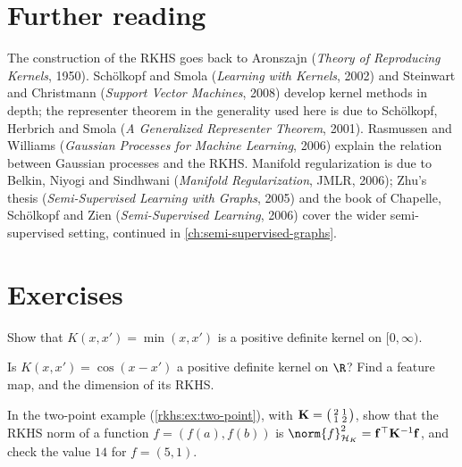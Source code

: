 \begin{notechapter}
\section*{Further reading}
The construction of the RKHS goes back to Aronszajn (\emph{Theory of Reproducing Kernels}, 1950). Schölkopf and Smola (\emph{Learning with Kernels}, 2002) and Steinwart and Christmann (\emph{Support Vector Machines}, 2008) develop kernel methods in depth; the representer theorem in the generality used here is due to Schölkopf, Herbrich and Smola (\emph{A Generalized Representer Theorem}, 2001). Rasmussen and Williams (\emph{Gaussian Processes for Machine Learning}, 2006) explain the relation between Gaussian processes and the RKHS. Manifold regularization is due to Belkin, Niyogi and Sindhwani (\emph{Manifold Regularization}, JMLR, 2006); Zhu's thesis (\emph{Semi-Supervised Learning with Graphs}, 2005) and the book of Chapelle, Schölkopf and Zien (\emph{Semi-Supervised Learning}, 2006) cover the wider semi-supervised setting, continued in \cref{ch:semi-supervised-graphs}.

\section*{Exercises}

\begin{exercise}\label{rkhs:exr:1}
Show that $K(x,x') = \min(x,x')$ is a positive definite kernel on $[0,\infty)$.
\end{exercise}

\begin{exercise}\label{rkhs:exr:2}
Is $K(x,x') = \cos(x - x')$ a positive definite kernel on $\R$? Find a feature map, and the dimension of its RKHS.
\end{exercise}

\begin{exercise}\label{rkhs:exr:3}
In the two-point example (\cref{rkhs:ex:two-point}), with $\mathbf{K} = \bigl(\begin{smallmatrix}2&1\\1&2\end{smallmatrix}\bigr)$, show that the RKHS norm of a function $f = (f(a), f(b))$ is $\norm{f}_{\hk}^2 = \mat f^\top\mat K^{-1}\mat f$, and check the value $14$ for $f = (5, 1)$.
\end{exercise}


\end{notechapter}

